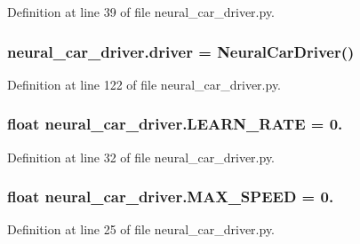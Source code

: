 Definition at line 39 of file neural\+\_\+car\+\_\+driver.\+py.

\subsubsection[{\texorpdfstring{driver}{driver}}]{\setlength{\rightskip}{0pt plus 5cm}neural\+\_\+car\+\_\+driver.\+driver = {\bf Neural\+Car\+Driver}()}\hypertarget{namespaceneural__car__driver_a277afd40b4a20897467cac1f802344ee}{}\label{namespaceneural__car__driver_a277afd40b4a20897467cac1f802344ee}


Definition at line 122 of file neural\+\_\+car\+\_\+driver.\+py.

\subsubsection[{\texorpdfstring{L\+E\+A\+R\+N\+\_\+\+R\+A\+TE}{LEARN_RATE}}]{\setlength{\rightskip}{0pt plus 5cm}float neural\+\_\+car\+\_\+driver.\+L\+E\+A\+R\+N\+\_\+\+R\+A\+TE = 0.}\hypertarget{namespaceneural__car__driver_a3873d214234a7685f0003bdedb09a3b5}{}\label{namespaceneural__car__driver_a3873d214234a7685f0003bdedb09a3b5}


Definition at line 32 of file neural\+\_\+car\+\_\+driver.\+py.

\subsubsection[{\texorpdfstring{M\+A\+X\+\_\+\+S\+P\+E\+ED}{MAX_SPEED}}]{\setlength{\rightskip}{0pt plus 5cm}float neural\+\_\+car\+\_\+driver.\+M\+A\+X\+\_\+\+S\+P\+E\+ED = 0.}\hypertarget{namespaceneural__car__driver_af2fef2c19127bf0b4e990d28542c7b6f}{}\label{namespaceneural__car__driver_af2fef2c19127bf0b4e990d28542c7b6f}


Definition at line 25 of file neural\+\_\+car\+\_\+driver.\+py.

